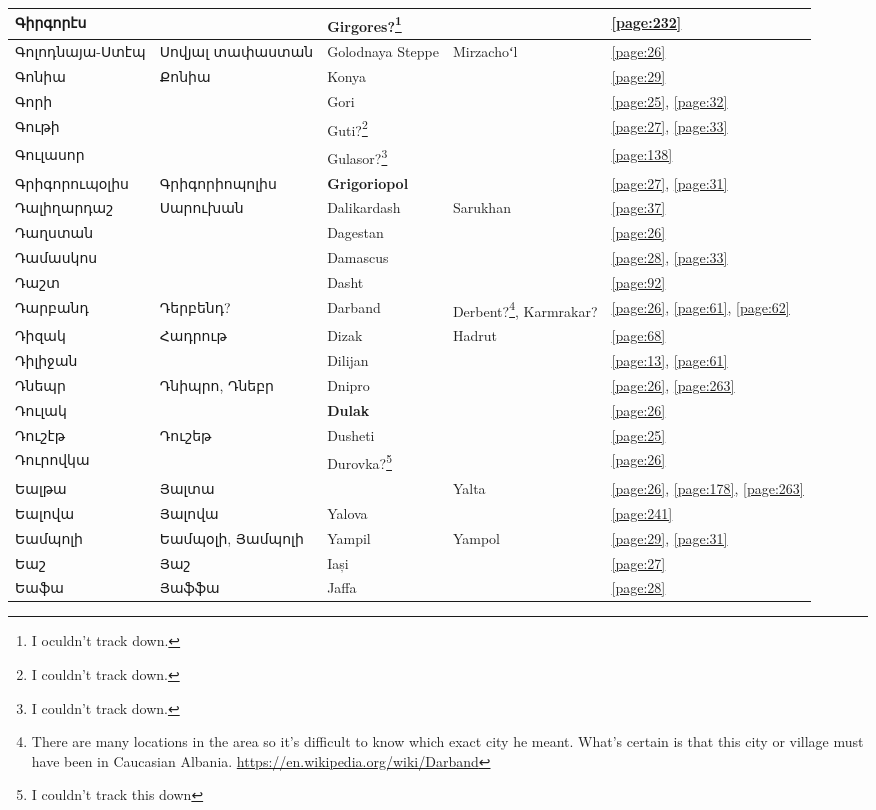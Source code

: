 \begin{center}
\begin{longtable}{|p{}|p{3cm}|p{3cm}|p{2cm}|p{3cm}|}
Գիրգորէս&  
&{Girgores}?\footnote{I oculdn't track down.} & &\ref{page:232}\\ \hline
Գոլոդնայա-Ստէպ& Սովյալ տափաստան& 
Golodnaya Steppe& Mirzachoʻl&\ref{page:26}\\ \hline
Գոնիա& Քոնիա& 
{Konya}& &\ref{page:29}\\ \hline
Գորի& & 
{Gori}& &\ref{page:25}, \ref{page:32}\\ \hline
Գութի& &
{Guti?}\footnote{I couldn't track down.}&  &\ref{page:27}, \ref{page:33}\\ \hline
Գուլասոր& &
 Gulasor?\footnote{I couldn't track down.}& &\ref{page:138}\\ \hline
Գրիգորուպօլիս&Գրիգորիոպոլիս
& \textbf{Grigoriopol}& &\ref{page:27}, \ref{page:31}\\ \hline
Դալիղարդաշ&Սարուխան
& {Dalikardash}& Sarukhan&\ref{page:37}\\ \hline
Դաղստան& & 
{Dagestan}& &\ref{page:26}\\ \hline
Դամասկոս& &
Damascus& &\ref{page:28}, \ref{page:33}\\ \hline
Դաշտ& & 
{Dasht}& &\ref{page:92}\\ \hline
Դարբանդ& Դերբենդ?&
{Darband}&Derbent?\footnote{There are many locations in the area so it's difficult to know which exact city he meant. What's certain is that this city or village must have been in Caucasian Albania. \url{https://en.wikipedia.org/wiki/Darband}}, Karmrakar? &\ref{page:26}, \ref{page:61}, \ref{page:62}\\ \hline
Դիզակ& Հադրութ& 
Dizak &Hadrut &\ref{page:68}\\ \hline
Դիլիջան& &
Dilijan& &\ref{page:13}, \ref{page:61}\\ \hline
Դնեպր&Դնիպրո, Դնեբր & 
{Dnipro}& &\ref{page:26}, \ref{page:263}\\ \hline
Դուլակ& &
\textbf{Dulak}& &\ref{page:26}\\ \hline
Դուշէթ& Դուշեթ
&{Dusheti} & &\ref{page:25}\\ \hline
Դուրովկա& 
&{Durovka?}\footnote{I couldn't track this down} & &\ref{page:26}\\ \hline
Եալթա& Յալտա& 
&{Yalta} &\ref{page:26}, \ref{page:178}, \ref{page:263}\\ \hline
Եալովա& Յալովա
&{Yalova} & &\ref{page:241}\\ \hline
Եամպոլի& Եամպօլի, Յամպոլի&
{Yampil}&Yampol &\ref{page:29}, \ref{page:31}\\ \hline
Եաշ&Յաշ &Iași & &\ref{page:27}\\ \hline
Եաֆա&Յաֆֆա & Jaffa& &\ref{page:28}\\ \hline

\end{longtable}
\end{center}
